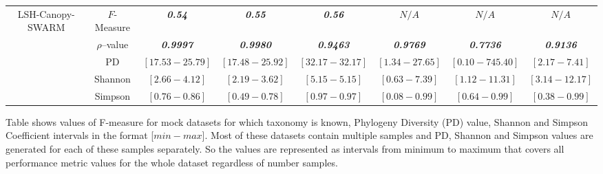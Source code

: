 \documentclass[10pt, conference, compsocconf]{IEEEtran}
\begin{document}
\begin{table}[t]
{\begin{tabular}{|c|c c c c c c c|}
\hline

\multirow{5}{*}{LSH-Canopy-SWARM} & $F$-Measure & \textit{\textbf{0.54}} & \textit{\textbf{0.55}} & \textit{\textbf{0.56}} & $N/A$ & $N/A$ & $N/A$\\
& $\rho$--value & \textit{\textbf{0.9997}} & \textit{\textbf{0.9980}} & \textit{\textbf{0.9463}} & \textit{\textbf{0.9769}} & \textit{\textbf{0.7736}} & \textit{\textbf{0.9136}}\\ 
& PD & $\left[17.53-25.79\right]$ & $\left[17.48-25.92\right]$ & $\left[32.17-32.17\right]$ & $\left[1.34-27.65\right]$ & $\left[0.10-745.40\right]$ & $\left[2.17-7.41\right]$\\ 
& Shannon & $\left[2.66-4.12\right]$ & $\left[2.19-3.62\right]$ & $\left[5.15-5.15\right]$ & $\left[0.63-7.39\right]$ & $\left[1.12-11.31\right]$ & $\left[3.14-12.17\right]$\\
& Simpson & $\left[0.76-0.86\right]$ & $\left[0.49-0.78\right]$ & $\left[0.97-0.97\right]$ & $\left[0.08-0.99\right]$ & $\left[0.64-0.99\right]$ & $\left[0.38-0.99\right]$\\

\hline

\end{tabular}
}
\small
\begin{tablenotes}
	\item Table shows values of F-measure for mock datasets for which taxonomy is known, Phylogeny Diversity (PD) value, Shannon and Simpson Coefficient intervals in the format [$min-max$]. Most of these datasets contain multiple samples and PD, Shannon and Simpson values are generated for each of these samples separately. So the values are represented as intervals from minimum to maximum that covers all performance metric values for the whole dataset regardless of number samples.    
\end{tablenotes}

\end{table} 
\end{document}
